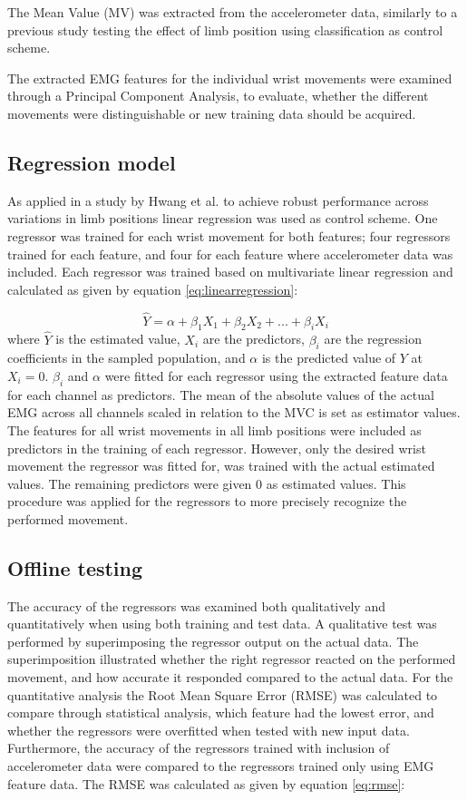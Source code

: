 The Mean Value (MV) was extracted from the accelerometer data, similarly to a previous study \cite{Krasoulis2015} testing the effect of limb position using classification as control scheme. 

The extracted EMG features for the individual wrist movements were examined through a Principal Component Analysis, to evaluate, whether the different movements were distinguishable or new training data should be acquired.

\subsection{Regression model}
As applied in a study by Hwang et al. \cite{hwang2017} to achieve robust performance across variations in limb positions linear regression was used as control scheme. One regressor was trained for each wrist movement for both features; four regressors trained for each feature, and four for each feature where accelerometer data was included. Each regressor was trained based on multivariate linear regression and calculated as given by equation \ref{eq:linearregression}:

\begin{equation} \label{eq:linearregression}
\hat{Y} = \alpha + \beta_1 X_{1} + \beta_2 X_{2} + ... + \beta_i X_{i}
\end{equation}
where $\hat{Y}$ is the estimated value, $X_i$ are the predictors, $\beta_i$ are the regression coefficients in the sampled population, and $\alpha$ is the predicted value of $Y$ at $X_{i} = 0$. $\beta_i$ and $\alpha$ were fitted for each regressor using the extracted feature data for each channel as predictors. The mean of the absolute values of the actual EMG across all channels scaled in relation to the MVC is set as estimator values. The features for all wrist movements in all limb positions were included as predictors in the training of each regressor. However, only the desired wrist movement the regressor was fitted for, was trained with the actual estimated values. The remaining predictors were given 0 as estimated values. This procedure was applied for the regressors to more precisely recognize the performed movement.

\subsection{Offline testing}
The accuracy of the regressors was examined both qualitatively and quantitatively when using both training and test data. A qualitative test was performed by superimposing the regressor output on the actual data. The superimposition illustrated whether the right regressor reacted on the performed movement, and how accurate it responded compared to the actual data. For the quantitative analysis the Root Mean Square Error (RMSE) was calculated to compare through statistical analysis, which feature had the lowest error, and whether the regressors were overfitted when tested with new input data. Furthermore, the accuracy of the regressors trained with inclusion of accelerometer data were compared to the regressors trained only using EMG feature data. The RMSE was calculated as given by equation \ref{eq:rmse}:

